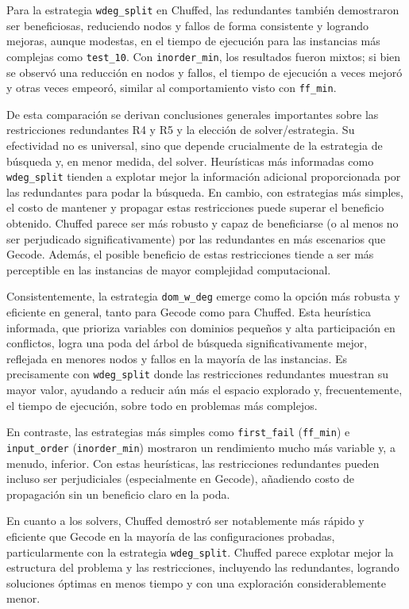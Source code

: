 Para la estrategia \texttt{wdeg\_split} en Chuffed, las redundantes también demostraron ser beneficiosas, reduciendo nodos y fallos de forma consistente y logrando mejoras, aunque modestas, en el tiempo de ejecución para las instancias más complejas como \texttt{test\_10}. Con \texttt{inorder\_min}, los resultados fueron mixtos; si bien se observó una reducción en nodos y fallos, el tiempo de ejecución a veces mejoró y otras veces empeoró, similar al comportamiento visto con \texttt{ff\_min}.

De esta comparación se derivan conclusiones generales importantes sobre las restricciones redundantes R4 y R5 y la elección de solver/estrategia. Su efectividad no es universal, sino que depende crucialmente de la estrategia de búsqueda y, en menor medida, del solver. Heurísticas más informadas como \texttt{wdeg\_split} tienden a explotar mejor la información adicional proporcionada por las redundantes para podar la búsqueda. En cambio, con estrategias más simples, el costo de mantener y propagar estas restricciones puede superar el beneficio obtenido. Chuffed parece ser más robusto y capaz de beneficiarse (o al menos no ser perjudicado significativamente) por las redundantes en más escenarios que Gecode. Además, el posible beneficio de estas restricciones tiende a ser más perceptible en las instancias de mayor complejidad computacional.

Consistentemente, la estrategia \texttt{dom\_w\_deg} emerge como la opción más robusta y eficiente en general, tanto para Gecode como para Chuffed. Esta heurística informada, que prioriza variables con dominios pequeños y alta participación en conflictos, logra una poda del árbol de búsqueda significativamente mejor, reflejada en menores nodos y fallos en la mayoría de las instancias. Es precisamente con \texttt{wdeg\_split} donde las restricciones redundantes muestran su mayor valor, ayudando a reducir aún más el espacio explorado y, frecuentemente, el tiempo de ejecución, sobre todo en problemas más complejos.

En contraste, las estrategias más simples como \texttt{first\_fail} (\texttt{ff\_min}) e \texttt{input\_order} (\texttt{inorder\_min}) mostraron un rendimiento mucho más variable y, a menudo, inferior. Con estas heurísticas, las restricciones redundantes pueden incluso ser perjudiciales (especialmente en Gecode), añadiendo costo de propagación sin un beneficio claro en la poda.

En cuanto a los solvers, Chuffed demostró ser notablemente más rápido y eficiente que Gecode en la mayoría de las configuraciones probadas, particularmente con la estrategia \texttt{wdeg\_split}. Chuffed parece explotar mejor la estructura del problema y las restricciones, incluyendo las redundantes, logrando soluciones óptimas en menos tiempo y con una exploración considerablemente menor.

